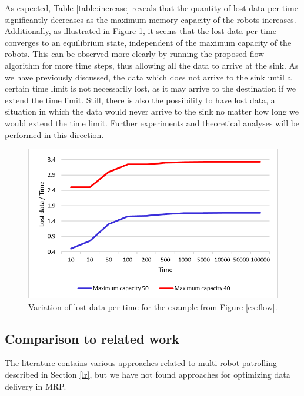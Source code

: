 As expected, Table \ref{table:increase} reveals that the quantity of lost data per time significantly decreases as the maximum memory capacity of the robots increases. Additionally, as illustrated in Figure \ref{fig:lostdata}, it seems that the lost data per time converges to an equilibrium state, independent of the maximum capacity of the robots. This can be observed more clearly by running the proposed flow algorithm for more time steps, thus allowing all the data to arrive at the sink. As we have previously discussed, the data which does not arrive to the sink until a certain time limit is not necessarily lost, as it may arrive to the destination if we extend the time limit. Still, there is also the possibility to have lost data, a situation in which the data would never arrive to the sink no matter how long we would extend the time limit. Further experiments and theoretical analyses will be performed in this direction.

\begin{figure}[!htb]
\centering
\includegraphics[scale=0.3]{Figures/Lost.png}
\caption{Variation of lost data per time for the example from Figure \ref{ex:flow}.}
\label{fig:lostdata}
\end{figure}

\subsection{Comparison to related work}\label{compRelatedWordkDynFloR}

The literature contains various approaches related to multi-robot patrolling described in Section \ref{lr}, but we have not found approaches for optimizing data delivery in MRP.

